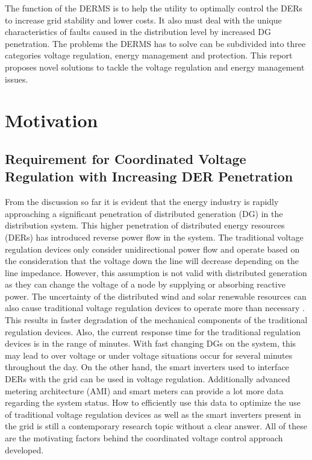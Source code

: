 The function of the DERMS is to help the utility to optimally control the DERs to increase grid stability and lower costs. It also must deal with the unique characteristics of faults caused in the distribution level by increased DG penetration. The problems the DERMS has to solve can be subdivided into three categories voltage regulation, energy management and protection. This report proposes novel solutions to tackle the voltage regulation and energy management issues.

\section{Motivation}
\subsection{Requirement for Coordinated Voltage Regulation with Increasing DER Penetration}
From the discussion so far it is evident that the energy industry is rapidly approaching a significant penetration of distributed generation (DG) in the distribution system. This higher penetration of distributed energy resources (DERs) has introduced reverse power flow in the system. The traditional voltage regulation devices only consider unidirectional power flow and operate based on the consideration that the voltage down the line will decrease depending on the line impedance. However, this assumption is not valid with distributed generation as they can change the voltage of a node by supplying or absorbing reactive power. The uncertainty of the distributed wind and solar renewable resources can also cause traditional voltage regulation devices to operate more than necessary \cite{int1}. This results in faster degradation of the mechanical components of the traditional regulation devices. Also, the current response time for the traditional regulation devices is in the range of minutes. With fast changing DGs on the system, this may lead to over voltage or under voltage situations occur for several minutes throughout the day. On the other hand, the smart inverters used to interface DERs with the grid can be used in voltage regulation. Additionally advanced metering architecture (AMI) and smart meters can provide a lot more data regarding the system status. How to efficiently use this data to optimize the use of traditional voltage regulation devices as well as the smart inverters present in the grid is still a contemporary research topic without a clear answer. All of these are the motivating factors behind the coordinated voltage control approach developed.

